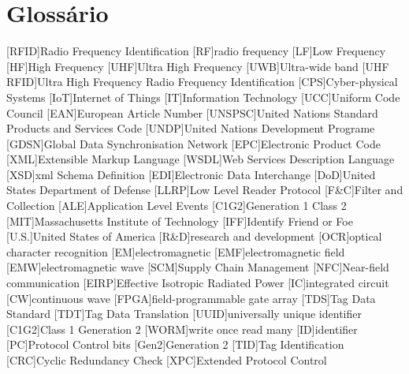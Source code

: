 \chapter{Glossário}

\footnotesize
\SingleSpacing

\begin{multicols}{2}
\begin{acronym}[AAAAAA]

	[RFID]{Radio Frequency Identification}
	[RF]{radio frequency}
	[LF]{Low Frequency}
	[HF]{High Frequency}
	[UHF]{Ultra High Frequency}
	[UWB]{Ultra-wide band}
	[UHF RFID]{Ultra High Frequency Radio Frequency Identification}
	[CPS]{Cyber-physical Systems}
	[IoT]{Internet of Things}
	[IT]{Information Technology}
	[UCC]{Uniform Code Council}
	[EAN]{European Article Number}
	[UNSPSC]{United Nations Standard Products and Services Code}
	[UNDP]{United Nations Development Programe}
	[GDSN]{Global Data Synchronisation Network}
	[EPC]{Electronic Product Code}
	[XML]{Extensible Markup Language}
	[WSDL]{Web Services Description Language}
	[XSD]{\acs{xml} Schema Definition}
	[EDI]{Electronic Data Interchange}
	[DoD]{United States Department of Defense}
	[LLRP]{Low Level Reader Protocol}
	[F\&C]{Filter and Collection}
	[ALE]{Application Level Events}
	[C1G2]{Generation 1 Class 2}
	[MIT]{Massachusetts Institute of Technology}
	[IFF]{Identify Friend or Foe}
	[U.S.]{United States of America}
	[R\&D]{research and development}
	[OCR]{optical character recognition}
	[EM]{electromagnetic}
	[EMF]{electromagnetic field}
	[EMW]{electromagnetic wave}
	[SCM]{Supply Chain Management}
	[NFC]{Near-field communication}
	[EIRP]{Effective Isotropic Radiated Power}
	[IC]{integrated circuit}
	[CW]{continuous wave}
	[FPGA]{field-programmable gate array}
	[TDS]{Tag Data Standard}
	[TDT]{Tag Data Translation}
	[UUID]{universally unique identifier}
	[C1G2]{Class 1 Generation 2}
	[WORM]{write once read many}
	[ID]{identifier}
	[PC]{Protocol Control bits}
	[Gen2]{Generation 2}
	[TID]{Tag Identification}
	[CRC]{Cyclic Redundancy Check}
	[XPC]{Extended Protocol Control}

\end{acronym}
\end{multicols}
